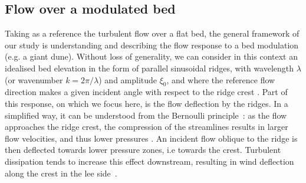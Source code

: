 \subsection{Flow over a modulated bed}
\label{theoretical_framework}
Taking as a reference the turbulent flow over a flat bed, the general framework of our study is understanding and describing the flow response to a bed modulation (e.g. a giant dune). Without loss of generality, we can consider in this context an idealised bed elevation in the form of parallel sinusoidal ridges, with wavelength $\lambda$ (or wavenumber $k = 2\pi/\lambda$) and amplitude $\xi_0$, and where the reference flow direction makes a given incident angle with respect to the ridge crest \citep{Andreotti2012}. Part of this response, on which we focus here, is the flow deflection by the ridges. In a simplified way, it can be understood from the Bernoulli principle~\citep{Hesp2015}: as the flow approaches the ridge crest, the compression of the streamlines results in larger flow velocities, and thus lower pressures \citep{Rubin1987}. An incident flow oblique to the ridge is then deflected towards lower pressure zones, i.e towards the crest. Turbulent dissipation tends to increase this effect downstream, resulting in wind deflection along the crest in the lee side~\citep{Gadal2019}.

